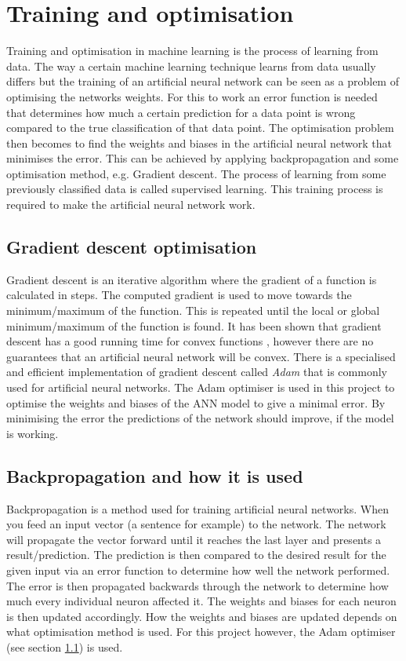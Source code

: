 \section{Training and optimisation} \label{sec:trainingoptimisation}
Training and optimisation in machine learning is the process of learning from data. The way a certain machine learning technique learns from data usually differs but the training of an artificial neural network can be seen as a problem of optimising the networks weights. For this to work an error function is needed that determines how much a certain prediction for a data point is wrong compared to the true classification of that data point. The optimisation problem then becomes to find the weights and biases in the artificial neural network that minimises the error. This can be achieved by applying backpropagation and some optimisation method, e.g. Gradient descent. The process of learning from some previously classified data is called supervised learning. This training process is required to make the artificial neural network work.

\subsection{Gradient descent optimisation}\label{sec:gradient_descent}
Gradient descent is an iterative algorithm where the gradient of a function is calculated in steps. The computed gradient is used to move towards the minimum/maximum of the function. This is repeated until the local or global minimum/maximum of the function is found. It has been shown that gradient descent has a good running time for convex functions \parencite{convexSGD}, however there are no guarantees that an artificial neural network will be convex. There is a specialised and efficient implementation of gradient descent called \textit{Adam} \parencite{adamoptimizer} that is commonly used for artificial neural networks. The Adam optimiser is used in this project to optimise the weights and biases of the ANN model to give a minimal error. By minimising the error the predictions of the network should improve, if the model is working.

\subsection{Backpropagation and how it is used}\label{sec:backpropagation}
Backpropagation is a method used for training artificial neural networks. When you feed an input vector (a sentence for example) to the network. The network will propagate the vector forward until it reaches the last layer and presents a result/prediction. The prediction is then compared to the desired result for the given input via an error function to determine how well the network performed. The error is then propagated backwards through the network to determine how much every individual neuron affected it. The weights and biases for each neuron is then updated accordingly. How the weights and biases are updated depends on what optimisation method is used. For this project however, the Adam optimiser (see section \ref{sec:gradient_descent}) is used. 

